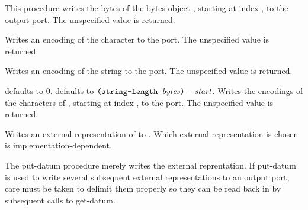 \begin{entry}{%
}
   
  This procedure writes the
 bytes of the bytes object , starting at index
, to the output port. The unspecified value is returned.
\end{entry}

\begin{entry}{%
}
   
Writes an encoding of the character  to the port. The
unspecified value is returned.
\end{entry}

\begin{entry}{%
}
   
Writes an encoding of the string to the port. The unspecified value is
returned.
\end{entry}   

\begin{entry}{%
}
   
   defaults to 0.   defaults to
$\texttt{(string-length \var{bytes})} - \var{start}$. Writes the
encodings of the  characters of , starting at
index , to the port. The unspecified value is returned.
\end{entry}


\begin{entry}{%
}

Writes an external representation of  to .
Which external representation is chosen is implementation-dependent.

\begin{note}
  The {\cf put-datum} procedure merely writes the external
  reprentation.  If {\cf put-datum} is used to write several
  subsequent external representations to an output port, care must be
  taken to delimit them properly so they can be read back in by
  subsequent calls to {\cf get-datum}.
\end{note}
\end{entry}

